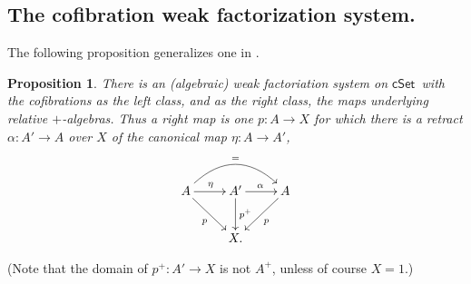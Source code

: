 \documentclass[11pt,reqno]{amsart}
\newcommand{\cSet}{\ensuremath{\mathsf{cSet}}}
\newcommand{\ra}{\ensuremath{\rightarrow}}
\renewcommand{\to}{\ensuremath{\rightarrow}}
\newtheorem{proposition}[theorem]{Proposition}
\theoremstyle{remark}
\theoremstyle{definition}
\begin{document}
\subsection*{The cofibration weak factorization system.}

The following proposition generalizes one in \cite{bourke-garner-I}.
\begin{proposition}
There is an (algebraic) weak factoriation system on \cSet\ with the cofibrations as the left class, and as the right class, the maps underlying relative $+$-algebras.  Thus a right map is one $p : A\ra X$ for which there is a retract $\alpha : A'\ra A$ over $X$ of the canonical map $\eta : A\ra A'$,
\[
\xymatrix{
A\ar[rd]_{p} \ar[r]^{\eta} \ar@/^5ex/ [rr]^= & A' \ar[r]^{\alpha} \ar[d]^-{p^+} & \ar[ld]^{p} A \\
& X. &
}
\]
\end{proposition}
%
(Note that the domain of $p^+ : A' \to X$ is not $A^+$, unless of course $X = 1$.)
\end{document}
